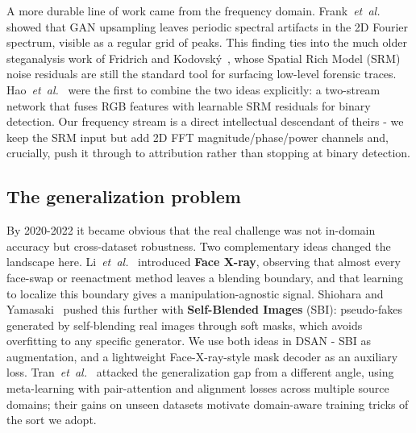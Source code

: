 A more durable line of work came from the frequency domain. Frank~\textit{et~al.}~\cite{frank2020leveraging} showed that GAN upsampling leaves periodic spectral artifacts in the 2D Fourier spectrum, visible as a regular grid of peaks. This finding ties into the much older steganalysis work of Fridrich and Kodovsk\'y~\cite{fridrich2012srm}, whose Spatial Rich Model (SRM) noise residuals are still the standard tool for surfacing low-level forensic traces. Hao~\textit{et~al.}~\cite{hao2021twostreamSRM} were the first to combine the two ideas explicitly: a two-stream network that fuses RGB features with learnable SRM residuals for binary detection. Our frequency stream is a direct intellectual descendant of theirs - we keep the SRM input but add 2D FFT magnitude/phase/power channels and, crucially, push it through to attribution rather than stopping at binary detection.

\subsection{The generalization problem}
By 2020-2022 it became obvious that the real challenge was not in-domain accuracy but cross-dataset robustness. Two complementary ideas changed the landscape here. Li~\textit{et~al.}~\cite{li2020facexray} introduced \textbf{Face X-ray}, observing that almost every face-swap or reenactment method leaves a blending boundary, and that learning to localize this boundary gives a manipulation-agnostic signal. Shiohara and Yamasaki~\cite{shiohara2022sbi} pushed this further with \textbf{Self-Blended Images} (SBI): pseudo-fakes generated by self-blending real images through soft masks, which avoids overfitting to any specific generator. We use both ideas in DSAN - SBI as augmentation, and a lightweight Face-X-ray-style mask decoder as an auxiliary loss. Tran~\textit{et~al.}~\cite{tran2023metadeepfake} attacked the generalization gap from a different angle, using meta-learning with pair-attention and alignment losses across multiple source domains; their gains on unseen datasets motivate domain-aware training tricks of the sort we adopt.

